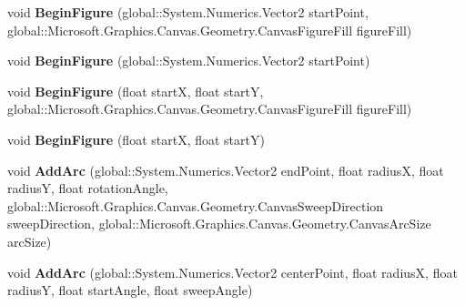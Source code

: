 \begin{DoxyCompactItemize}
void {\bfseries Begin\+Figure} (global\+::\+System.\+Numerics.\+Vector2 start\+Point, global\+::\+Microsoft.\+Graphics.\+Canvas.\+Geometry.\+Canvas\+Figure\+Fill figure\+Fill)
\item 
\mbox{\label{class_microsoft_1_1_graphics_1_1_canvas_1_1_geometry_1_1_canvas_path_builder_a58b72d59626692a590f9613507b1613d}} 
void {\bfseries Begin\+Figure} (global\+::\+System.\+Numerics.\+Vector2 start\+Point)
\item 
\mbox{\label{class_microsoft_1_1_graphics_1_1_canvas_1_1_geometry_1_1_canvas_path_builder_a13ecf54f872f85460fbe3ea214d7b143}} 
void {\bfseries Begin\+Figure} (float startX, float startY, global\+::\+Microsoft.\+Graphics.\+Canvas.\+Geometry.\+Canvas\+Figure\+Fill figure\+Fill)
\item 
\mbox{\label{class_microsoft_1_1_graphics_1_1_canvas_1_1_geometry_1_1_canvas_path_builder_accd5484b3a6afe779cc05b671ceab2d6}} 
void {\bfseries Begin\+Figure} (float startX, float startY)
\item 
\mbox{\label{class_microsoft_1_1_graphics_1_1_canvas_1_1_geometry_1_1_canvas_path_builder_ad5ebacfef42f16ddadc505b289750362}} 
void {\bfseries Add\+Arc} (global\+::\+System.\+Numerics.\+Vector2 end\+Point, float radiusX, float radiusY, float rotation\+Angle, global\+::\+Microsoft.\+Graphics.\+Canvas.\+Geometry.\+Canvas\+Sweep\+Direction sweep\+Direction, global\+::\+Microsoft.\+Graphics.\+Canvas.\+Geometry.\+Canvas\+Arc\+Size arc\+Size)
\item 
\mbox{\label{class_microsoft_1_1_graphics_1_1_canvas_1_1_geometry_1_1_canvas_path_builder_a5bc022c0799cfd3c392f412fc76aeb53}} 
void {\bfseries Add\+Arc} (global\+::\+System.\+Numerics.\+Vector2 center\+Point, float radiusX, float radiusY, float start\+Angle, float sweep\+Angle)
\item 
\mbox{\label{class_microsoft_1_1_graphics_1_1_canvas_1_1_geometry_1_1_canvas_path_builder_a192b933b8c38dcc6fd799668ab3a2e96}} 

\end{DoxyCompactItemize}
